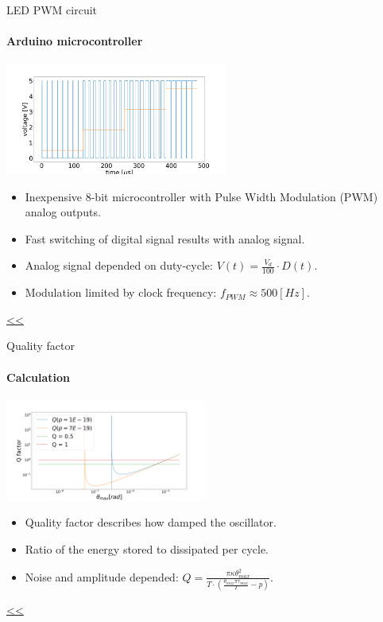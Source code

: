 \documentclass{beamer}
\begin{document}
\begin{frame}{\hypertarget{frame:LED PWM circuit 1}{LED PWM circuit}}
	\framesubtitle{Arduino microcontroller}
	\begin{center}		
		\includegraphics[width=0.55\textwidth,keepaspectratio]{duty_cycle.png}
	\end{center}
	\begin{itemize}		
		\item Inexpensive 8-bit microcontroller with Pulse Width Modulation (PWM) analog outputs.
		\item Fast switching of digital signal results with analog signal.
		\item Analog signal depended on duty-cycle: $V(t) =  \frac{V_d}{100}\cdot D(t)$.
		\item Modulation limited by clock frequency: $f_{PWM} \approx 500[Hz]$.
	\end{itemize}
	\hyperlink{frame:LED PWM circuit}{<<} 
\end{frame}

\begin{frame}{\hypertarget{frame:Quality factor 1}{Quality factor}}
	\framesubtitle{Calculation}
	\begin{center}		
		\includegraphics[width=0.5\textwidth,keepaspectratio]{Q factor.png}
	\end{center}
	\begin{itemize}	
		\item Quality factor describes how damped the oscillator.
		\item Ratio of the energy stored to dissipated per cycle.
		\item Noise and amplitude depended: $Q =  \frac{\pi\kappa\theta_{max}^2}{T\cdot(\frac{\theta_{max}\pi\tau_{max}}{T} -p)} $.
					
	\end{itemize}
	\hyperlink{frame:Quality factor}{<<} 

\end{frame}
\end{document}
